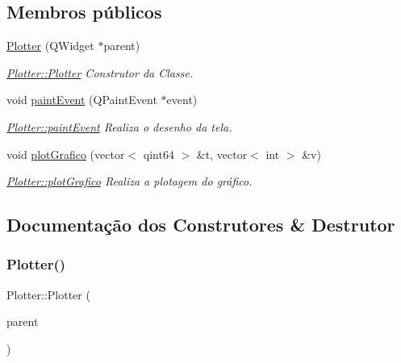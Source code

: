 \subsection*{Membros públicos}
\begin{DoxyCompactItemize}
\item 
\hyperlink{class_plotter_a9d8f6981cf177bc3e843465d2b3425e9}{Plotter} (Q\+Widget $\ast$parent)
\begin{DoxyCompactList}\small\item\em \hyperlink{class_plotter_a9d8f6981cf177bc3e843465d2b3425e9}{Plotter\+::\+Plotter} Construtor da Classe. \end{DoxyCompactList}\item 
void \hyperlink{class_plotter_a06477bf987646f000a8982db1352a11d}{paint\+Event} (Q\+Paint\+Event $\ast$event)
\begin{DoxyCompactList}\small\item\em \hyperlink{class_plotter_a06477bf987646f000a8982db1352a11d}{Plotter\+::paint\+Event} Realiza o desenho da tela. \end{DoxyCompactList}\item 
void \hyperlink{class_plotter_a29034483f5519c5bf9dac3ac849e0466}{plot\+Grafico} (vector$<$ qint64 $>$ \&t, vector$<$ int $>$ \&v)
\begin{DoxyCompactList}\small\item\em \hyperlink{class_plotter_a29034483f5519c5bf9dac3ac849e0466}{Plotter\+::plot\+Grafico} Realiza a plotagem do gráfico. \end{DoxyCompactList}\end{DoxyCompactItemize}


\subsection{Documentação dos Construtores \& Destrutor}
\mbox{\label{class_plotter_a9d8f6981cf177bc3e843465d2b3425e9}} 
\subsubsection{\texorpdfstring{Plotter()}{Plotter()}}
{\footnotesize\ttfamily Plotter\+::\+Plotter (\begin{DoxyParamCaption}\item[{Q\+Widget $\ast$}]{parent }\end{DoxyParamCaption})}



